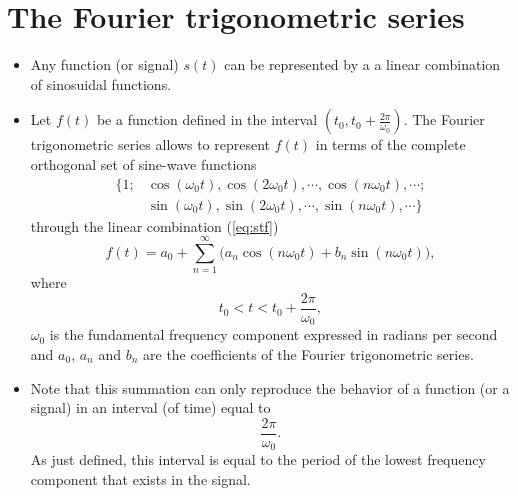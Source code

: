 \section{The Fourier trigonometric series}
\begin{itemize}
\item Any function (or signal) $s(t)$ can be represented by a a linear
  combination of sinosuidal functions.
\item Let $f(t)$ be a function defined in the interval $(t_0,
  t_0+\frac{2\pi}{\omega_0})$. The Fourier trigonometric series allows
  to represent $f(t)$ in terms of the complete orthogonal set of
  sine-wave
  functions~\cite{Oppenheim} \begin{equation*} \begin{array}{ll} \{1;
  & \cos(\omega_0t), \cos(2\omega_0t), \cdots, \cos(n\omega_0t), \cdots;\\
  & \sin(\omega_0t), \sin(2\omega_0t), \cdots, \sin(n\omega_0t), \cdots\} \end{array} \end{equation*}
  through the linear combination (\ref{eq:stf}) \begin{equation} f(t)
  = a_0 + \sum_{n=1}^\infty \big(a_n \cos(n\omega_0t) +
  b_n \sin(n\omega_0t)\big), \tag{stf} \label{eq:stf} \end{equation}
  where $$t_0<t<t_0+\frac{2\pi}{\omega_0},$$ $\omega_0$ is the fundamental
  frequency component expressed in radians per second and $a_0$, $a_n$
  and $b_n$ are the coefficients of the Fourier trigonometric series.
\item Note that this summation can only reproduce the behavior of a
  function (or a signal) in an interval (of time) equal to
  \begin{displaymath}
    \frac{2\pi}{\omega_0}.
  \end{displaymath}
  As just defined, this interval is equal to the period of the lowest
  frequency component that exists in the signal.
\end{itemize}

